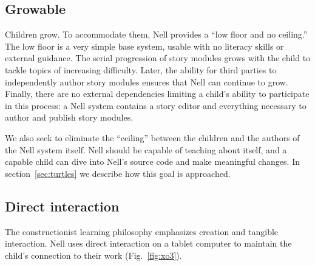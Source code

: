 \documentclass[preprint]{sig-alternate}
\begin{document}
\subsection{Growable}


Children grow. To accommodate them, Nell provides a ``low floor and
no ceiling.''  The low
floor is a very simple base system, usable with no literacy skills or
external guidance.  The serial progression of story modules grows with
the child to tackle topics of increasing difficulty.
Later, the ability for third
parties to independently author story modules ensures that
Nell can continue to grow.  Finally, there are no external dependencies
limiting a child's ability to participate in this process: a Nell
system contains a story editor and everything necessary to
author and publish story modules.

We also seek to eliminate the ``ceiling'' between the children and
the authors of the Nell system itself.  Nell should be capable of
teaching about itself, and a capable child can dive into Nell's source
code and make meaningful changes.  In section~\ref{sec:turtles} we
describe how this goal is approached.


\subsection{Direct interaction}


The constructionist learning philosophy emphasizes creation and
tangible interaction.  Nell uses direct interaction on a tablet
computer to maintain the child's connection to their work
(Fig.~\ref{fig:xo3}).
\end{document}
